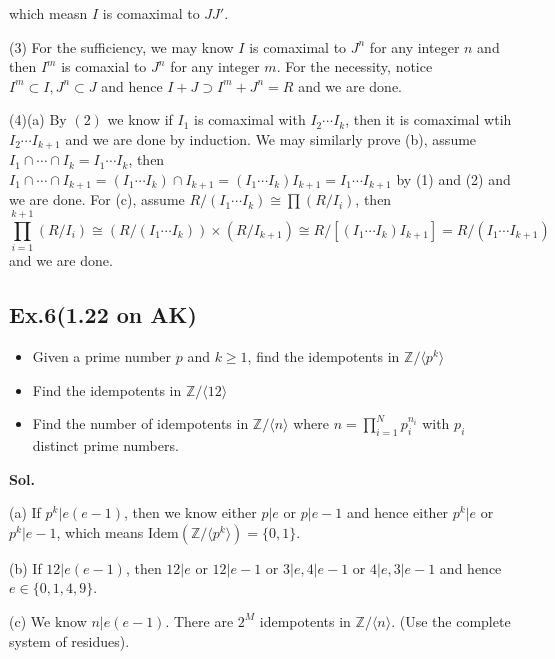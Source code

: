 \documentclass[lang=en,11pt,a4paper,citestyle =authoryear]{elegantpaper}
\begin{document}
which measn $I$ is comaximal to $JJ'$.\par
(3) For the sufficiency, we may know $I$ is comaximal to $J^n$  for any integer $n$ and then $I^m$ is comaxial to $J^n$ for any integer $m$. For the necessity, notice $I^m \subset I, J^n \subset J$ and hence $I+J\supset I^m+J^n =R$ and we are done.\par
(4)(a) By $(2)$ we know if $I_1$ is comaximal with $I_2\cdots I_k$, then it is comaximal wtih $I_2\cdots I_{k+1}$ and we are done by induction. We may similarly prove (b), assume $I_1\cap\cdots\cap I_k = I_1\cdots I_k$, then $I_1\cap\cdots \cap I_{k+1} = (I_1\cdots I_k)\cap I_{k+1} = (I_1\cdots I_k)I_{k+1} = I_1\cdots I_{k+1}$ by (1) and (2) and we are done. For (c), assume $R/(I_1\cdots I_k) \cong \prod (R/I_i)$, then \[\prod_{i=1}^{k+1} (R/I_i) \cong (R/(I_1\cdots I_{k}))\times(R/I_{k+1}) \cong R/[(I_1\cdots I_k)I_{k+1}] = R/(I_1\cdots I_{k+1})\]
and we are done.
\par 
\vspace{0.5em}

\subsection*{Ex.6(1.22 on AK)} 
\begin{itemize}
    \item Given a prime number $p$ and $k\geq 1$, find the idempotents in $\mathbb{Z}/\langle p^k\rangle$
    \item Find the idempotents in $\mathbb{Z}/\langle 12\rangle$
    \item Find the number of idempotents in $\mathbb{Z}/\langle n\rangle$ where $n = \prod_{i=1}^N p_i^{n_i}$ with $p_i$ distinct prime numbers.
\end{itemize}
\vspace{0.5em}
\textbf{Sol.} \par
(a) If $p^k|e(e-1)$, then we know either $p|e$ or $p|e-1$ and hence either $p^k|e$ or $p^k|e-1$, which means $\text{Idem}(\mathbb{Z}/\langle p^k \rangle) = \{0,1\}$.\par
(b) If $12|e(e-1)$, then $12|e$ or $12|e-1$ or $3|e,4|e-1$ or $4|e,3|e-1$ and hence $e\in\{0,1,4,9\}$.
\par 
(c) We know $n|e(e-1)$. There are $2^M$ idempotents in $\mathbb{Z}/\langle n \rangle$. (Use the complete system of residues).
\vspace{0.5em}
\end{document}
